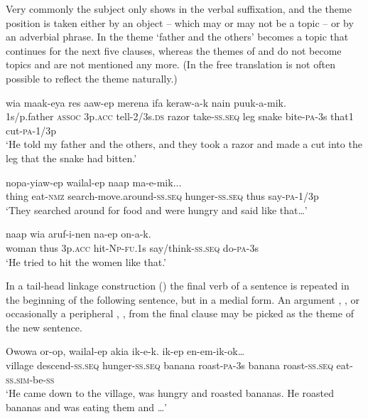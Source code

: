 Very commonly the subject only shows in the verbal suffixation, and the theme position is taken either by an object -- which may or may not be a topic -- or by an adverbial phrase. In  the theme  `father and the others' becomes a topic that continues for the next five clauses, whereas the themes of  and  do not become topics and are not mentioned any more. (In the free translation is not often possible to reflect the theme naturally.)

\ea%
\label{ex:9:x1909}
\gll {}    wia  maak-eya  res  aaw-ep  merena  ifa  keraw-a-k  nain  puuk-a-mik. \\
1s/p.father  \textsc{assoc}  3p.\textsc{acc}  tell-2/3s.\textsc{ds}  razor  take-\textsc{ss}.\textsc{seq} leg  snake  bite-\textsc{pa}-3s  that1  cut-\textsc{pa}-1/3p     \\
\glt`He told my father and the others, and they took  a razor and made a cut into the leg that the snake had bitten.'
\z


\ea%
\label{ex:9:x1910}
\gll {}    nopa-yiaw-ep  wailal-ep  naap  ma-e-mik...\\
thing  eat-\textsc{nmz}  search-move.around-\textsc{ss}.\textsc{seq}  hunger-\textsc{ss}.\textsc{seq} thus  say-\textsc{pa}-1/3p      \\
\glt`They searched around for food and were hungry and said like that{\dots}'
\z


\ea%
\label{ex:9:x1911}
\gll {}  naap  wia  aruf-i-nen  na-ep  on-a-k. \\
woman  thus  3p.\textsc{acc}  hit-\textsc{Np}-\textsc{fu}.1s  say/think-\textsc{ss}.\textsc{seq} do-\textsc{pa}-3s      \\
\glt`He tried to hit the women like that.'
\z


In a tail-head linkage construction () the final verb of a sentence is repeated in the beginning of the following sentence, but in a medial form. An argument , , or occasionally a peripheral , , from the final clause may be picked as the theme of the new sentence.

\ea%
\label{ex:9:x1912}
\gll Owowa  or-op,  wailal-ep  akia  ik-e-k.   ik-ep  en-em-ik-ok{\dots} \\
village  descend-\textsc{ss}.\textsc{seq}  hunger-\textsc{ss}.\textsc{seq}  banana  roast-\textsc{pa}-3s banana  roast-\textsc{ss}.\textsc{seq}  eat-\textsc{ss}.\textsc{sim}-be-\textsc{ss}     \\
\glt`He came down to the village, was hungry and roasted bananas. He roasted bananas and was eating them and {\dots}'
\z


